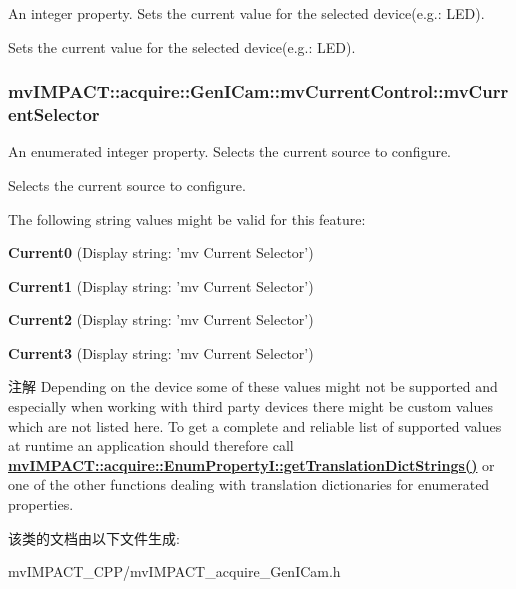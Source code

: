 An integer property. Sets the current value for the selected device(e.\+g.\+: L\+E\+D). 

Sets the current value for the selected device(e.\+g.\+: L\+E\+D). \hypertarget{classmv_i_m_p_a_c_t_1_1acquire_1_1_gen_i_cam_1_1mv_current_control_ab00b8204becd1be4ce0ca8a72193c9f8}{
\subsubsection[{mv\+Current\+Selector}]{ mv\+I\+M\+P\+A\+C\+T\+::acquire\+::\+Gen\+I\+Cam\+::mv\+Current\+Control\+::mv\+Current\+Selector}}\label{classmv_i_m_p_a_c_t_1_1acquire_1_1_gen_i_cam_1_1mv_current_control_ab00b8204becd1be4ce0ca8a72193c9f8}


An enumerated integer property. Selects the current source to configure. 

Selects the current source to configure.

The following string values might be valid for this feature\+:
\begin{DoxyItemize}
\item {\bfseries Current0} (Display string\+: 'mv Current Selector')
\item {\bfseries Current1} (Display string\+: 'mv Current Selector')
\item {\bfseries Current2} (Display string\+: 'mv Current Selector')
\item {\bfseries Current3} (Display string\+: 'mv Current Selector')
\end{DoxyItemize}

\begin{DoxyNote}{注解}
Depending on the device some of these values might not be supported and especially when working with third party devices there might be custom values which are not listed here. To get a complete and reliable list of supported values at runtime an application should therefore call {\bfseries \hyperlink{classmv_i_m_p_a_c_t_1_1acquire_1_1_enum_property_i_a0ba6ccbf5ee69784d5d0b537924d26b6}{mv\+I\+M\+P\+A\+C\+T\+::acquire\+::\+Enum\+Property\+I\+::get\+Translation\+Dict\+Strings()}} or one of the other functions dealing with translation dictionaries for enumerated properties. 
\end{DoxyNote}


该类的文档由以下文件生成\+:\begin{DoxyCompactItemize}
\item 
mv\+I\+M\+P\+A\+C\+T\+\_\+\+C\+P\+P/mv\+I\+M\+P\+A\+C\+T\+\_\+acquire\+\_\+\+Gen\+I\+Cam.\+h\end{DoxyCompactItemize}
